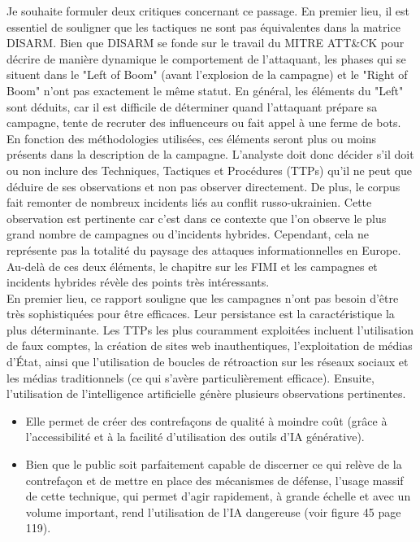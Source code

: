 \documentclass[a4paper]{article}
\begin{document}
Je souhaite formuler deux critiques concernant ce passage. En premier lieu, il est essentiel de souligner que les tactiques ne sont pas équivalentes dans la matrice DISARM. Bien que DISARM se fonde sur le travail du MITRE ATT\&CK pour décrire de manière dynamique le comportement de l'attaquant, les phases qui se situent dans le "Left of Boom" (avant l'explosion de la campagne) et le "Right of Boom" n'ont pas exactement le même statut. En général, les éléments du "Left" sont déduits, car il est difficile de déterminer quand l'attaquant prépare sa campagne, tente de recruter des influenceurs ou fait appel à une ferme de bots. En fonction des méthodologies utilisées, ces éléments seront plus ou moins présents dans la description de la campagne. L'analyste doit donc décider s'il doit ou non inclure des Techniques, Tactiques et Procédures (TTPs) qu'il ne peut que déduire de ses observations et non pas observer directement.
De plus, le corpus fait remonter de nombreux incidents liés au conflit russo-ukrainien. Cette observation est pertinente car c'est dans ce contexte que l'on observe le plus grand nombre de campagnes ou d'incidents hybrides. Cependant, cela ne représente pas la totalité du paysage des attaques informationnelles en Europe.
Au-delà de ces deux éléments, le chapitre sur les FIMI et les campagnes et incidents hybrides révèle des points très intéressants.
\\

En premier lieu, ce rapport souligne que les campagnes n'ont pas besoin d'être très sophistiquées pour être efficaces. Leur persistance est la caractéristique la plus déterminante. Les TTPs les plus couramment exploitées incluent l'utilisation de faux comptes, la création de sites web inauthentiques, l'exploitation de médias d'État, ainsi que l'utilisation de boucles de rétroaction sur les réseaux sociaux et les médias traditionnels (ce qui s'avère particulièrement efficace).
Ensuite, l'utilisation de l'intelligence artificielle génère plusieurs observations pertinentes.
\\

\begin{itemize}
\item Elle permet de créer des contrefaçons de qualité à moindre coût (grâce à l'accessibilité et à la facilité d'utilisation des outils d'IA générative).
\item Bien que le public soit parfaitement capable de discerner ce qui relève de la contrefaçon et de mettre en place des mécanismes de défense, l'usage massif de cette technique, qui permet d'agir rapidement, à grande échelle et avec un volume important, rend l'utilisation de l'IA dangereuse (voir figure 45 page 119).
\\

\end{itemize}
\end{document}

